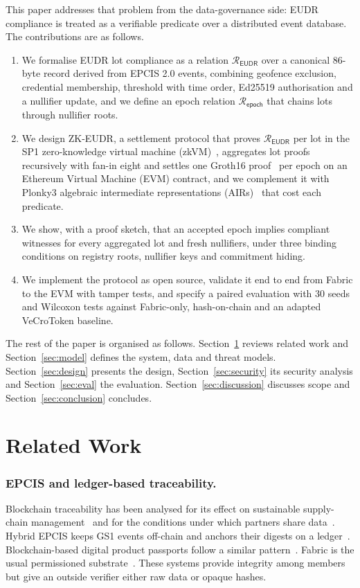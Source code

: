 \documentclass[runningheads]{llncs}
\newcommand{\Rel}{\mathcal{R}_{\mathsf{EUDR}}}
\newcommand{\Repoch}{\mathcal{R}_{\mathsf{epoch}}}
\begin{document}
This paper addresses that problem from the data-governance side: EUDR compliance is treated as a verifiable predicate over a distributed event database. The contributions are as follows.
\begin{enumerate}
\item We formalise EUDR lot compliance as a relation $\Rel$ over a canonical 86-byte record derived from EPCIS 2.0 events, combining geofence exclusion, credential membership, threshold with time order, Ed25519 authorisation and a nullifier update, and we define an epoch relation $\Repoch$ that chains lots through nullifier roots.
\item We design ZK-EUDR, a settlement protocol that proves $\Rel$ per lot in the SP1 zero-knowledge virtual machine (zkVM)~\cite{sp1}, aggregates lot proofs recursively with fan-in eight and settles one Groth16 proof~\cite{groth2016} per epoch on an Ethereum Virtual Machine (EVM) contract, and we complement it with Plonky3 algebraic intermediate representations (AIRs)~\cite{plonky3} that cost each predicate.
\item We show, with a proof sketch, that an accepted epoch implies compliant witnesses for every aggregated lot and fresh nullifiers, under three binding conditions on registry roots, nullifier keys and commitment hiding.
\item We implement the protocol as open source, validate it end to end from Fabric to the EVM with tamper tests, and specify a paired evaluation with 30 seeds and Wilcoxon tests against Fabric-only, hash-on-chain and an adapted VeCroToken baseline.
\end{enumerate}

The rest of the paper is organised as follows. Section~\ref{sec:related} reviews related work and Section~\ref{sec:model} defines the system, data and threat models. Section~\ref{sec:design} presents the design, Section~\ref{sec:security} its security analysis and Section~\ref{sec:eval} the evaluation. Section~\ref{sec:discussion} discusses scope and Section~\ref{sec:conclusion} concludes.

\section{Related Work}
\label{sec:related}

\subsubsection{EPCIS and ledger-based traceability.}
Blockchain traceability has been analysed for its effect on sustainable supply-chain management~\cite{saberi2019blockchain} and for the conditions under which partners share data~\cite{behnke2020boundary}. Hybrid EPCIS keeps GS1 events off-chain and anchors their digests on a ledger~\cite{tolcha2025hybrid}. Blockchain-based digital product passports follow a similar pattern~\cite{abreu2025dpp}. Fabric is the usual permissioned substrate~\cite{androulaki2018fabric}. These systems provide integrity among members but give an outside verifier either raw data or opaque hashes.
\end{document}
